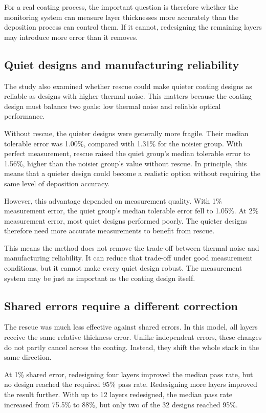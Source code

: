 For a real coating process, the important question is therefore whether the monitoring system can measure layer thicknesses more accurately than the deposition process can control them. If it cannot, redesigning the remaining layers may introduce more error than it removes.

\subsection{Quiet designs and manufacturing reliability}

The study also examined whether rescue could make quieter coating designs as reliable as designs with higher thermal noise. This matters because the coating design must balance two goals: low thermal noise and reliable optical performance.

Without rescue, the quieter designs were generally more fragile. Their median tolerable error was 1.00\%, compared with 1.31\% for the noisier group. With perfect measurement, rescue raised the quiet group's median tolerable error to 1.56\%, higher than the noisier group's value without rescue. In principle, this means that a quieter design could become a realistic option without requiring the same level of deposition accuracy.

However, this advantage depended on measurement quality. With 1\% measurement error, the quiet group's median tolerable error fell to 1.05\%. At 2\% measurement error, most quiet designs performed poorly. The quieter designs therefore need more accurate measurements to benefit from rescue.

This means the method does not remove the trade-off between thermal noise and manufacturing reliability. It can reduce that trade-off under good measurement conditions, but it cannot make every quiet design robust. The measurement system may be just as important as the coating design itself.

\subsection{Shared errors require a different correction}

The rescue was much less effective against shared errors. In this model, all layers receive the same relative thickness error. Unlike independent errors, these changes do not partly cancel across the coating. Instead, they shift the whole stack in the same direction.

At 1\% shared error, redesigning four layers improved the median pass rate, but no design reached the required 95\% pass rate. Redesigning more layers improved the result further. With up to 12 layers redesigned, the median pass rate increased from 75.5\% to 88\%, but only two of the 32 designs reached 95\%.

